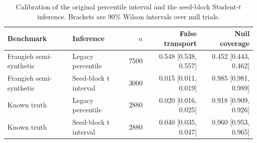 \begin{table}[t]
\centering
\small
\caption{Calibration of the original percentile interval and the seed-block Student-$t$ inference. Brackets are 90\% Wilson intervals over null trials.}
\label{tab:dadj-calibration}
\begin{tabular}{llrrr}
\toprule
Benchmark & Inference & $n$ & False transport & Null coverage \\
\midrule
Frangieh semi-synthetic & Legacy percentile & 7500 & 0.548 [0.538, 0.557] & 0.452 [0.443, 0.462] \\
Frangieh semi-synthetic & Seed-block t interval & 3000 & 0.015 [0.011, 0.019] & 0.985 [0.981, 0.989] \\
Known truth & Legacy percentile & 2880 & 0.020 [0.016, 0.025] & 0.918 [0.909, 0.926] \\
Known truth & Seed-block t interval & 2880 & 0.040 [0.035, 0.047] & 0.960 [0.953, 0.965] \\
\bottomrule
\end{tabular}
\end{table}
